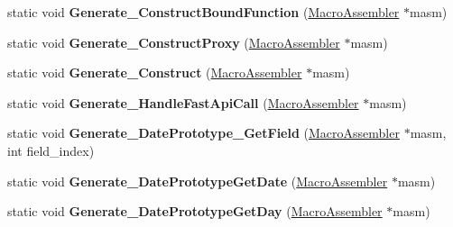\begin{DoxyCompactItemize}
\item 
static void {\bfseries Generate\+\_\+\+Construct\+Bound\+Function} (\hyperlink{classv8_1_1internal_1_1_macro_assembler}{Macro\+Assembler} $\ast$masm)\hypertarget{classv8_1_1internal_1_1_builtins_a69c9758c923e13f8cb03695df2ad2902}{}\label{classv8_1_1internal_1_1_builtins_a69c9758c923e13f8cb03695df2ad2902}

\item 
static void {\bfseries Generate\+\_\+\+Construct\+Proxy} (\hyperlink{classv8_1_1internal_1_1_macro_assembler}{Macro\+Assembler} $\ast$masm)\hypertarget{classv8_1_1internal_1_1_builtins_ab0998da25376c05b9a5c36f0d46dd061}{}\label{classv8_1_1internal_1_1_builtins_ab0998da25376c05b9a5c36f0d46dd061}

\item 
static void {\bfseries Generate\+\_\+\+Construct} (\hyperlink{classv8_1_1internal_1_1_macro_assembler}{Macro\+Assembler} $\ast$masm)\hypertarget{classv8_1_1internal_1_1_builtins_abc0212820b14e7acad043965c219d2f6}{}\label{classv8_1_1internal_1_1_builtins_abc0212820b14e7acad043965c219d2f6}

\item 
static void {\bfseries Generate\+\_\+\+Handle\+Fast\+Api\+Call} (\hyperlink{classv8_1_1internal_1_1_macro_assembler}{Macro\+Assembler} $\ast$masm)\hypertarget{classv8_1_1internal_1_1_builtins_a372e35e66c71a5e640fcb3f7533a0586}{}\label{classv8_1_1internal_1_1_builtins_a372e35e66c71a5e640fcb3f7533a0586}

\item 
static void {\bfseries Generate\+\_\+\+Date\+Prototype\+\_\+\+Get\+Field} (\hyperlink{classv8_1_1internal_1_1_macro_assembler}{Macro\+Assembler} $\ast$masm, int field\+\_\+index)\hypertarget{classv8_1_1internal_1_1_builtins_a2c9fe0f8abe241337ee9fbd829df670f}{}\label{classv8_1_1internal_1_1_builtins_a2c9fe0f8abe241337ee9fbd829df670f}

\item 
static void {\bfseries Generate\+\_\+\+Date\+Prototype\+Get\+Date} (\hyperlink{classv8_1_1internal_1_1_macro_assembler}{Macro\+Assembler} $\ast$masm)\hypertarget{classv8_1_1internal_1_1_builtins_a90616d02a4ad04f62fe8fd3f61adfcb0}{}\label{classv8_1_1internal_1_1_builtins_a90616d02a4ad04f62fe8fd3f61adfcb0}

\item 
static void {\bfseries Generate\+\_\+\+Date\+Prototype\+Get\+Day} (\hyperlink{classv8_1_1internal_1_1_macro_assembler}{Macro\+Assembler} $\ast$masm)\hypertarget{classv8_1_1internal_1_1_builtins_ad6cd12e305dce843d5640a4f45b463ec}{}\label{classv8_1_1internal_1_1_builtins_ad6cd12e305dce843d5640a4f45b463ec}


\end{DoxyCompactItemize}
